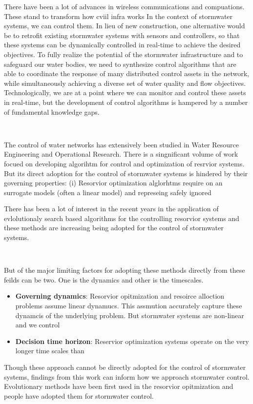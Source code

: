 There have been a lot of advances in wireless communications and compuations.
These stand to transform how cviil infra works
In the context of stormwater systems, we can control them.
In lieu of new construction, one alternative would be to retrofit  existing stormwater systems with sensors and controllers, so that these systems can be dynamically controlled in real-time to achieve the desired objectives.
To fully realize the potential of the stormwater infrastructure and to safeguard our water bodies, we need to synthesize control algorithms that are able to coordinate the response of many distributed control assets in the network, while simultaneously achieving a diverse set of water quality and flow objectives. 
Technologically, we are at a point where we can monitor and control these assets in real-time, but the development of control algorithms is hampered by a number of fundamental knowledge gaps.


\

The control of water networks has extensively been studied in Water Resource Engineering and Operational Research.
There is a singnificant volume of work focued on developing algorihtm for control and optimization of resrvior systems.
But its direct adoption for the control of stormwater systems is hindered by their governing properties:
(i) Resorvior optimization alglorhtms require on an surrogate models (often a linear model) and represeing 
safely ignored 

There has been a lot of interest in the recent years in the application of evlolutionaly search based algorithms for the controlling resorvior systems and these methods are increasing being adopted for the control of stormwater systems.

\


But of the major limiting factors for adopting these methods directly from these feilds can be two. 
One is the dynamics and other is the timescales.
\begin{itemize}
	\item \textbf{Governing dynamics}: Resorvior opitmization and resoirce alloction problems assume linear dynamucs. This assmution accurately capture these dynamcis of the underlying problem. But stormwater systems are non-linear and we control  
	\item \textbf{Decision time horizon}: Reservior optimization systems operate on the very longer time scales than 
\end{itemize}
Though these approach cannot be directly adopted for the control of stormwater systems, findings from this work can inform how we approach stormwater control.
Evolutionary methods have been first used in the resorvior opitmization and people have adopted them for stormwater control. 

